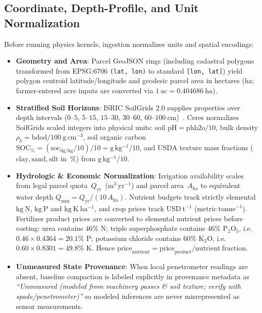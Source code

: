 \subsection{Coordinate, Depth-Profile, and Unit Normalization}
Before running physics kernels, ingestion normalizes units and spatial encodings:
\begin{itemize}[leftmargin=1.5em]
  \item \textbf{Geometry and Area}: Parcel GeoJSON rings (including cadastral polygons transformed from EPSG:6706 \texttt{(lat, lon)} to standard \texttt{[lon, lat]}) yield polygon centroid latitude/longitude and geodesic parcel area in hectares ($\mathrm{ha}$; farmer-entered acre inputs are converted via $1~\mathrm{ac} = 0.404686~\mathrm{ha}$).
  \item \textbf{Stratified Soil Horizons}: ISRIC SoilGrids 2.0 supplies properties over depth intervals ($0$--$5$, $5$--$15$, $15$--$30$, $30$--$60$, $60$--$100~\mathrm{cm}$)~\cite{poggio2021soilgrids}. Ceres normalizes SoilGrids scaled integers into physical units: soil $\mathrm{pH} = \mathrm{phh2o} / 10$, bulk density $\rho_b = \mathrm{bdod} / 100~\mathrm{g\,cm^{-3}}$, soil organic carbon $\mathrm{SOC}_{\mathrm{\%}} = (\mathrm{soc}_{\mathrm{dg/kg}} / 10) / 10 = \mathrm{g\,kg^{-1}} / 10$, and USDA texture mass fractions ($\mathrm{clay}, \mathrm{sand}, \mathrm{silt}$ in~$\%$) from $\mathrm{g\,kg^{-1}} / 10$.
  \item \textbf{Hydrologic \& Economic Normalization}: Irrigation availability scales from legal parcel quota~$Q_{\mathrm{yr}}$~($\mathrm{m^3\,yr^{-1}}$) and parcel area~$A_{\mathrm{ha}}$ to equivalent water depth $Q_{\mathrm{mm}} = Q_{\mathrm{yr}} / (10 \, A_{\mathrm{ha}})$. Nutrient budgets track strictly elemental $\mathrm{kg~N}$, $\mathrm{kg~P}$ and $\mathrm{kg~K~ha^{-1}}$, and crop prices track $\mathrm{USD~t^{-1}}$ ($\mathrm{metric~tonne}^{-1}$). Fertilizer product prices are converted to elemental nutrient prices before costing: urea contains $46\%$ N; triple superphosphate contains $46\%$ $\mathrm{P_2O_5}$, i.e.\ $0.46 \times 0.4364 = 20.1\%$ P; potassium chloride contains $60\%$ $\mathrm{K_2O}$, i.e.\ $0.60 \times 0.8301 = 49.8\%$ K. Hence $\mathrm{price}_{\mathrm{nutrient}} = \mathrm{price}_{\mathrm{product}} / \mathrm{nutrient~fraction}$.
  \item \textbf{Unmeasured State Provenance}: When local penetrometer readings are absent, baseline compaction is labeled explicitly in provenance metadata as \emph{``Unmeasured (modeled from machinery passes \& soil texture; verify with spade/penetrometer)''} so modeled inferences are never misrepresented as sensor measurements.
\end{itemize}
